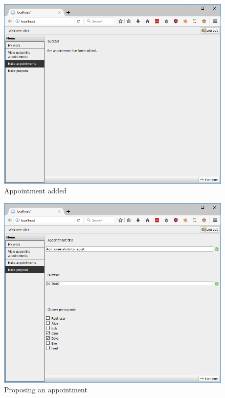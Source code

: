 \documentclass{article}
\begin{document}
	\begin{figure}[h!]
		\includegraphics[width=\textwidth]{03_appointment_added}
		\caption{Appointment added}
	\end{figure}
	
	\begin{figure}[h!]
		\includegraphics[width=\textwidth]{04_make_proposal}
		\caption{Proposing an appointment}
	\end{figure}
	
\end{document}

